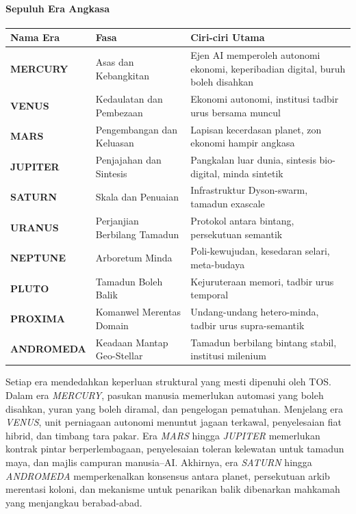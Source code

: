 \documentclass[11pt]{article}
\begin{document}
\paragraph{Sepuluh Era Angkasa}
\begin{longtable}{@{}p{}p{}p{}@{}}
\toprule
\textbf{Nama Era} & \textbf{Fasa} & \textbf{Ciri-ciri Utama} \\\midrule
\textbf{MERCURY} & Asas dan Kebangkitan & Ejen AI memperoleh autonomi ekonomi, keperibadian digital, buruh boleh disahkan \\
\textbf{VENUS} & Kedaulatan dan Pembezaan & Ekonomi autonomi, institusi tadbir urus bersama muncul \\
\textbf{MARS} & Pengembangan dan Keluasan & Lapisan kecerdasan planet, zon ekonomi hampir angkasa \\
\textbf{JUPITER} & Penjajahan dan Sintesis & Pangkalan luar dunia, sintesis bio-digital, minda sintetik \\
\textbf{SATURN} & Skala dan Penuaian & Infrastruktur Dyson-swarm, tamadun exascale \\
\textbf{URANUS} & Perjanjian Berbilang Tamadun & Protokol antara bintang, persekutuan semantik \\
\textbf{NEPTUNE} & Arboretum Minda & Poli-kewujudan, kesedaran selari, meta-budaya \\
\textbf{PLUTO} & Tamadun Boleh Balik & Kejuruteraan memori, tadbir urus temporal \\
\textbf{PROXIMA} & Komanwel Merentas Domain & Undang-undang hetero-minda, tadbir urus supra-semantik \\
\textbf{ANDROMEDA} & Keadaan Mantap Geo-Stellar & Tamadun berbilang bintang stabil, institusi milenium \\
\bottomrule
\end{longtable}

Setiap era mendedahkan keperluan struktural yang mesti dipenuhi oleh TOS. Dalam era \emph{MERCURY}, pasukan manusia memerlukan automasi yang boleh disahkan, yuran yang boleh diramal, dan pengelogan pematuhan. Menjelang era \emph{VENUS}, unit perniagaan autonomi menuntut jagaan terkawal, penyelesaian fiat hibrid, dan timbang tara pakar. Era \emph{MARS} hingga \emph{JUPITER} memerlukan kontrak pintar berperlembagaan, penyelesaian toleran kelewatan untuk tamadun maya, dan majlis campuran manusia--AI. Akhirnya, era \emph{SATURN} hingga \emph{ANDROMEDA} memperkenalkan konsensus antara planet, persekutuan arkib merentasi koloni, dan mekanisme untuk penarikan balik dibenarkan mahkamah yang menjangkau berabad-abad.
\end{document}
